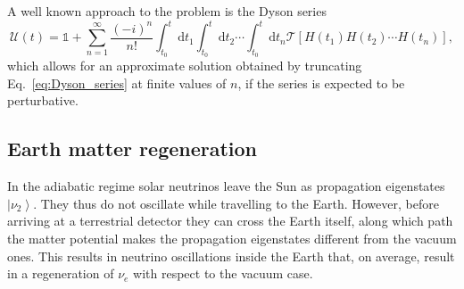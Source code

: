 \documentclass{article}
\newcommand{\de}[0]{\text{d}}
\newcommand{\ket}[1]{\left| #1 \right>}
\begin{document}
A well known approach to the problem is the Dyson series 
\begin{equation}
	\mathcal{U}(t) = \mathbb{1} + \sum_{n=1}^\infty \frac{\left(-i\right)^n}{n!} \int_{t_0}^t \de t_1 \int_{t_0}^t \de t_2 \cdots \int_{t_0}^t \de t_n \mathcal{T} \left[H(t_1) H(t_2) \cdots H(t_n) \right], \label{eq:Dyson_series}
\end{equation}
which allows for an approximate solution obtained by truncating Eq.~\ref{eq:Dyson_series} at finite values of $n$, if the series is expected to be perturbative. 
%
%

\subsection{Earth matter regeneration}
In the adiabatic regime solar neutrinos leave the Sun as propagation eigenstates $\ket{\nu_2}$. They thus do not oscillate while travelling to the Earth. However, before arriving at a terrestrial detector they can cross the Earth itself, along which path the matter potential makes the propagation eigenstates different from the vacuum ones. This results in neutrino oscillations inside the Earth that, on average, result in a regeneration of $\nu_e$ with respect to the vacuum case.
\end{document}
